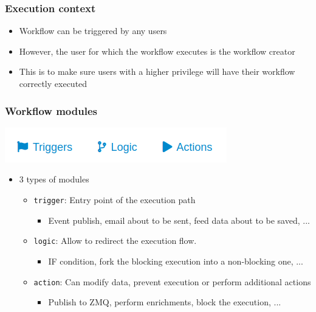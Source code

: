 \begin{frame}
    \frametitle{Execution context}
    \begin{itemize}
        \item Workflow can be triggered by any users
        \item However, the user for which the workflow executes is the workflow creator
        \item This is to make sure users with a higher privilege will have their workflow correctly executed
    \end{itemize}
\end{frame}

\begin{frame}
    \frametitle{Workflow modules}
    \begin{center}
        \includegraphics[width=0.5\linewidth]{pictures/module-type.png}
    \end{center}
    \begin{itemize}
        \item 3 types of modules
        \begin{itemize}
            \item \texttt{trigger}: Entry point of the execution path
            \begin{itemize}
                \item Event publish, email about to be sent, feed data about to be saved, ...
            \end{itemize}
            \item \texttt{logic}: Allow to redirect the execution flow.
            \begin{itemize}
                \item IF condition, fork the blocking execution into a non-blocking one, ...
            \end{itemize}
            \item \texttt{action}: Can modify data, prevent execution or perform additional actions
            \begin{itemize}
                \item Publish to ZMQ, perform enrichments, block the execution, ...
            \end{itemize}
        \end{itemize}
    \end{itemize}
\end{frame}

